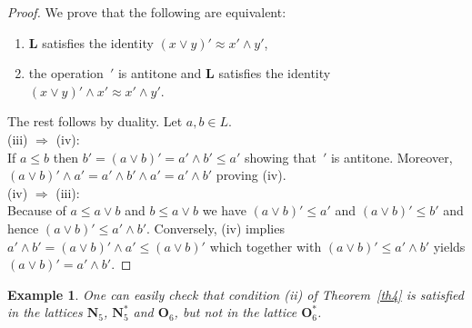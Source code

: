 \documentclass[12pt]{article}
\newtheorem{example}[theorem]{Example}
\begin{document}
\begin{proof}
We prove that the following are equivalent:
\begin{enumerate}
\item[(iii)] $\mathbf L$ satisfies the identity $(x\vee y)'\approx x'\wedge y'$,
\item[(iv)] the operation $\,'$ is antitone and $\mathbf L$ satisfies the identity $(x\vee y)'\wedge x'\approx x'\wedge y'$.
\end{enumerate}
The rest follows by duality. Let $a,b\in L$. \\
(iii) $\Rightarrow$ (iv): \\
If $a\le b$ then $b'=(a\vee b)'=a'\wedge b'\le a'$ showing that $\,'$ is antitone. Moreover, $(a\vee b)'\wedge a'=a'\wedge b'\wedge a'=a'\wedge b'$ proving (iv). \\
(iv) $\Rightarrow$ (iii): \\
Because of $a\le a\vee b$ and $b\le a\vee b$ we have $(a\vee b)'\le a'$ and $(a\vee b)'\le b'$ and hence $(a\vee b)'\le a'\wedge b'$. Conversely, (iv) implies $a'\wedge b'=(a\vee b)'\wedge a'\le(a\vee b)'$ which together with $(a\vee b)'\le a'\wedge b'$ yields $(a\vee b)'=a'\wedge b'$.
\end{proof}

\begin{example}
One can easily check that condition {\rm(ii)} of Theorem~\ref{th4} is satisfied in the lattices $\mathbf N_5$, $\mathbf N_5^*$ and $\mathbf O_6$, but not in the lattice $\mathbf O_6^*$.
\end{example}





\end{document}
